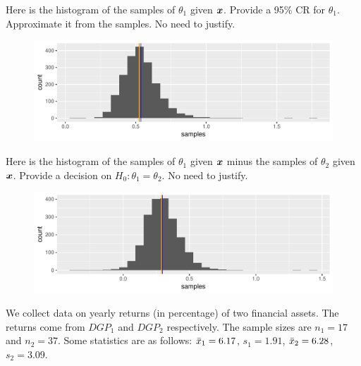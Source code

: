 \documentclass[12pt]{article}
\begin{document}
\begin{enumerate}[(a)]
 Here is the histogram of the samples of $\theta_1$ given $\boldsymbol{x}$. Provide a 95\% CR for $\theta_1$. Approximate it from the samples. No need to justify. 
%
\iftoggle{solutions}{\inred{
\beqn
[0.3, 0.8]
\eeqn
}}{~\\~\\Your answer: }
%

\begin{figure}[h]
    \centering
    \includegraphics[width=5in]{theta1s.pdf}
    \label{fig:enter-label}
\end{figure}
\FloatBarrier

 Here is the histogram of the samples of $\theta_1$ given $\boldsymbol{x}$ minus the samples of $\theta_2$ given $\boldsymbol{x}$. Provide a decision on $H_0: \theta_1 = \theta_2$. No need to justify. 
%
\iftoggle{solutions}{\inred{
\beqn
\text{Reject $H_0$}
\eeqn

}}{~\\~\\Your answer: }
%

\begin{figure}[h]
    \centering
    \includegraphics[width=5in]{diffs.pdf}
    \label{fig:enter-label}
\end{figure}
\FloatBarrier
\end{enumerate}
\pagebreak

\problem We collect data on yearly returns (in percentage) of two financial assets. The returns come from $DGP_1$ and $DGP_2$ respectively. The sample sizes are $n_1 = 17$ and $n_2 = 37$. Some statistics are as follows: $\bar{x}_1 = 6.17$, $s_1 = 1.91$, $\bar{x}_2 = 6.28$, $s_2 = 3.09$. 
\end{document}

